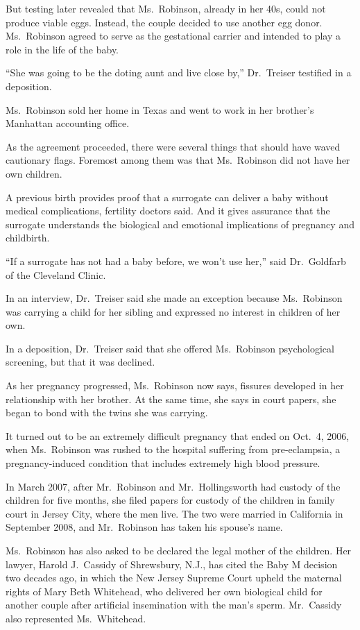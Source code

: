 ﻿\documentclass[12pt]{article}
\begin{document}
But testing later revealed that Ms.~Robinson, already in her 40s, could not produce viable eggs.
Instead, the couple decided to use another egg donor. Ms.~Robinson agreed to serve as the
gestational carrier and intended to play a role in the life of the baby.

``She was going to be the doting aunt and live close by,'' Dr.~Treiser testified in a deposition.

Ms.~Robinson sold her home in Texas and went to work in her brother's Manhattan accounting office.

As the agreement proceeded, there were several things that should have waved cautionary flags.
Foremost among them was that Ms.~Robinson did not have her own children.

A previous birth provides proof that a surrogate can deliver a baby without medical complications,
fertility doctors said. And it gives assurance that the surrogate understands the biological and
emotional implications of pregnancy and childbirth.

``If a surrogate has not had a baby before, we won't use her,'' said Dr.~Goldfarb of the Cleveland
Clinic.

In an interview, Dr.~Treiser said she made an exception because Ms.~Robinson was carrying a child
for her sibling and expressed no interest in children of her own.

In a deposition, Dr.~Treiser said that she offered Ms.~Robinson psychological screening, but that it
was declined.

As her pregnancy progressed, Ms.~Robinson now says, fissures developed in her relationship with her
brother. At the same time, she says in court papers, she began to bond with the twins she was
carrying.

It turned out to be an extremely difficult pregnancy that ended on Oct.~4, 2006, when Ms.~Robinson
was rushed to the hospital suffering from pre-eclampsia, a pregnancy-induced condition that includes
extremely high blood pressure.

In March 2007, after Mr.~Robinson and Mr.~Hollingsworth had custody of the children for five months,
she filed papers for custody of the children in family court in Jersey City, where the men live. The
two were married in California in September 2008, and Mr.~Robinson has taken his spouse's name.

Ms.~Robinson has also asked to be declared the legal mother of the children. Her lawyer, Harold
J.~Cassidy of Shrewsbury, N.J., has cited the Baby M decision two decades ago, in which the New
Jersey Supreme Court upheld the maternal rights of Mary Beth Whitehead, who delivered her own
biological child for another couple after artificial insemination with the man's sperm. Mr.~Cassidy
also represented Ms.~Whitehead.
\end{document}
